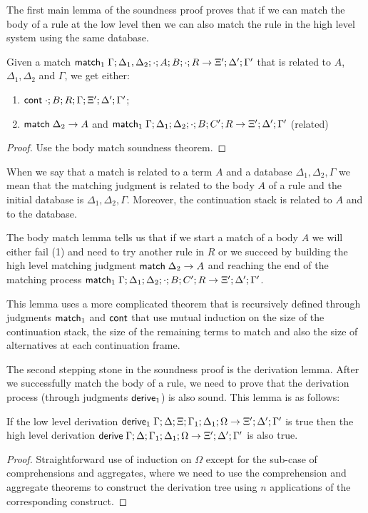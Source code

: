 The first main lemma of the soundness proof proves that if we can match the body
of a rule at the low level then we can also match the rule in the high level system using the same database.

\begin{lemma}
   Given a match $\mathsf{match}_1 \; \Gamma; \Delta_1, \Delta_2; \cdot; A; B; \cdot; R \rightarrow \Xi'; \Delta'; \Gamma'$ that is related to $A$, $\Delta_1, \Delta_2$ and $\Gamma$, we get either:
   
   \begin{enumerate}
      \item $\mathsf{cont} \; \cdot; B; R; \Gamma; \Xi'; \Delta'; \Gamma'$;
      \item $\mathsf{match} \; \Delta_2 \rightarrow A$ and $\mathsf{match}_1 \; \Gamma; \Delta_1; \Delta_2; \cdot; B; C'; R \rightarrow \Xi'; \Delta'; \Gamma'$ (related)
   \end{enumerate}
\end{lemma}
\begin{proof}
   Use the body match soundness theorem.
\end{proof}

When we say that a match is related to a term $A$ and a database $\Delta_1, \Delta_2, \Gamma$ we mean that
the matching judgment is related to the body $A$ of a rule and the initial database is $\Delta_1, \Delta_2, \Gamma$. Moreover, the continuation stack is related to $A$ and to the database.

The body match lemma tells us that if we start a match of a body $A$ we will either fail (1) and need to try another rule in $R$ or we succeed by building the high level matching judgment $\mathsf{match} \; \Delta_2 \rightarrow A$ and reaching the end of the matching process $\mathsf{match}_1 \; \Gamma; \Delta_1; \Delta_2; \cdot; B; C'; R \rightarrow \Xi'; \Delta'; \Gamma'$.

This lemma uses a more complicated theorem that is recursively defined through judgments $\mathsf{match}_1$ and $\mathsf{cont}$ that use mutual induction on the size of the continuation stack, the size of the remaining terms
 to match and also the size of alternatives at each continuation frame.
 
The second stepping stone in the soundness proof is the derivation lemma. After we successfully match the
body of a rule, we need to prove that the derivation process (through judgments $\mathsf{derive}_1$) is also
sound. This lemma is as follows:

\begin{lemma}[Derivation]
   If the low level derivation $\mathsf{derive}_1 \; \Gamma; \Delta; \Xi; \Gamma_1; \Delta_1; \Omega \rightarrow \Xi'; \Delta'; \Gamma'$ is true then the high level derivation $\mathsf{derive} \; \Gamma; \Delta; \Gamma_1; \Delta_1; \Omega \rightarrow \Xi'; \Delta'; \Gamma'$ is also true.
\end{lemma}
\begin{proof}
   Straightforward use of induction on $\Omega$ except for the sub-case of comprehensions and aggregates, where we need to use the comprehension and aggregate theorems to construct the derivation tree using $n$ applications of the corresponding construct.
\end{proof}

